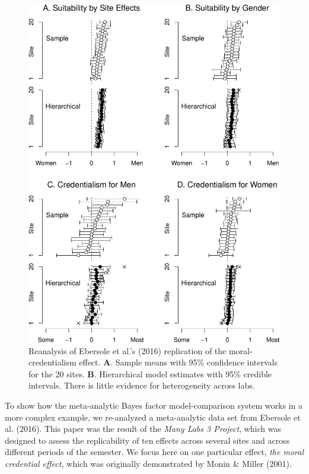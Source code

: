 \documentclass[english,man]{apa6}
\theoremstyle{definition}
\theoremstyle{definition}
\theoremstyle{remark}
\begin{document}
\begin{figure}[htbp]
\centering
\includegraphics{p_files/figure-latex/ml3Est-1.pdf}
\caption{\label{fig:ml3Est}Reanalysis of Ebersole et al.'s (2016)
replication of the moral-credentialism effect. \textbf{A}. Sample means
with 95\% confidence intervals for the 20 sites. \textbf{B}.
Hierarchical model estimates with 95\% credible intervals. There is
little evidence for heterogeneity across labs.}
\end{figure}

To show how the meta-analytic Bayes factor model-comparison system works
in a more complex example, we re-analyzed a meta-analytic data set from
Ebersole et al. (2016). This paper was the result of the \emph{Many Labs
3 Project}, which was designed to assess the replicability of ten
effects across several sites and across different periods of the
semester. We focus here on one particular effect, \emph{the moral
credential effect,} which was originally demonstrated by Monin \& Miller
(2001).
\end{document}
